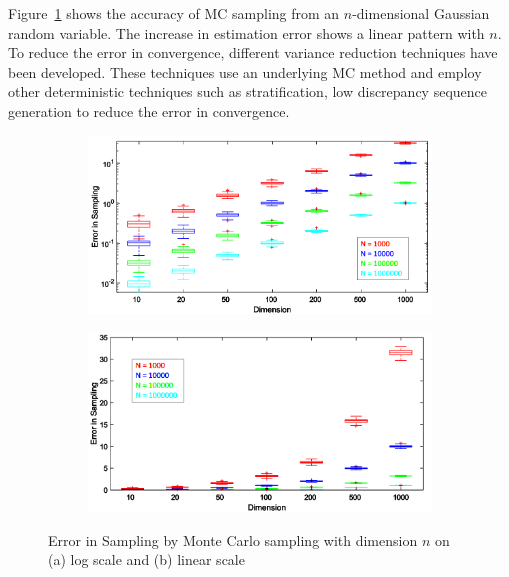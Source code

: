 Figure~\ref{fig:monte_accuracy} shows the accuracy of MC sampling from an $n$-dimensional Gaussian random variable. The increase in estimation error shows a linear pattern with $n$. To reduce the error in convergence, different variance reduction techniques have been developed. These techniques use an underlying MC method and employ other deterministic techniques such as stratification, low discrepancy sequence generation to reduce the error in convergence. 


\begin{figure}[H]
\centering
\begin{subfigure}{0.45\textwidth}
\centering
\includegraphics[width=\textwidth]{uq_figs/monte_log}
\caption{}
\end{subfigure}
\begin{subfigure}{0.45\textwidth}
\centering
\includegraphics[width=\textwidth]{uq_figs/monte_linear}
\caption{}
\end{subfigure}
\caption{Error in Sampling by Monte Carlo sampling with dimension $n$ on (a) log scale and (b) linear scale}
\label{fig:monte_accuracy}
\end{figure}



